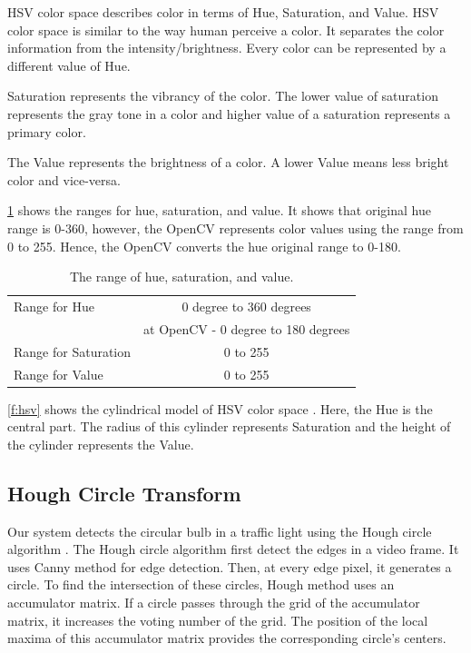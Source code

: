 HSV color space describes color in terms of Hue, Saturation, and Value.
HSV color space is similar to the way human perceive a color.
It separates the color information from the intensity/brightness.
Every color can be represented by a different value of Hue.

Saturation represents the vibrancy of the color.
The lower value of saturation represents the gray tone in a color and higher value of a saturation represents a primary color.

The Value represents the brightness of a color.
A lower Value means less bright color and vice-versa.

\ref{t:hsv} shows the ranges for hue, saturation, and value.
It shows that original hue range is 0-360, however, the OpenCV \cite{opencv} represents color values using the range from 0 to 255. 
Hence, the OpenCV converts the hue original range to 0-180.

\begin{table}[h!]
  \centering
  \caption{The range of hue, saturation, and value.}
  \label{t:hsv}
  \begin{tabular}{  l | c  }
    
    Range for Hue & 0 degree to 360 degrees \\
    & at OpenCV - 0 degree to 180 degrees\\
    \hline
    Range for Saturation & 0 to 255 \\
    \hline 
    Range for Value & 0 to 255 \\
    
  \end{tabular}
\end{table}


\ref{f:hsv} shows the cylindrical model of HSV color space \cite{hsv}.
Here, the Hue is the central part.
The radius of this cylinder represents Saturation and the height of the cylinder represents the Value.

\subsection{Hough Circle Transform}
Our system detects the circular bulb in a traffic light using the Hough circle algorithm \cite{houghcir_alg}.
The Hough circle algorithm first detect the edges in a video frame.
It uses Canny method \cite{canny} for edge detection.
Then, at every edge pixel, it generates a circle.
To find the intersection of these circles, Hough method uses an accumulator matrix.
If a circle passes through the grid of the accumulator matrix, it increases the voting number of the grid.
The position of the local maxima of this accumulator matrix provides the corresponding circle's centers.







